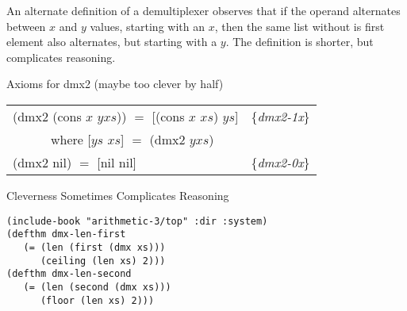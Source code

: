 \begin{aside}
An alternate definition of a demultiplexer
observes that if the operand alternates between $x$ and $y$ values,
starting with an $x$,
then the same list without is first element also alternates,
but starting with a $y$. The definition is shorter,
but complicates reasoning.\\
\begin{center}
Axioms for \textsf{dmx2} (maybe too clever by half)
\begin{tabular}{ll}
\textsf{(dmx2 (cons $x$ $yxs$)) $=$ [(cons $x$ $xs$) $ys$]}& \{\emph{dmx2-1x}\} \\
~~~~~~where \textsf{[$ys$ $xs$] $=$ (dmx2 $yxs$)}          & \\
\textsf{(dmx2 nil) $=$ [nil nil] }                         & \{\emph{dmx2-0x}\} \\
\end{tabular}
\end{center}
\caption{Cleverness Sometimes Complicates Reasoning}
\label{aside:dmx-defun-trick}
\end{aside}

\label{thm:dmx-length-first-second}
\begin{Verbatim}
(include-book "arithmetic-3/top" :dir :system)
(defthm dmx-len-first
   (= (len (first (dmx xs)))
      (ceiling (len xs) 2)))
(defthm dmx-len-second
   (= (len (second (dmx xs)))
      (floor (len xs) 2)))
\end{Verbatim}

